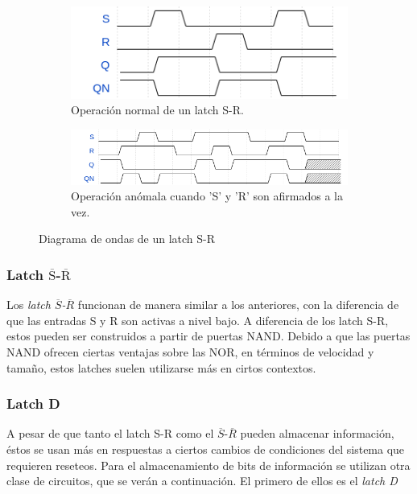 \begin{figure}[h]
    \centering
  
    \begin{subfigure}[b]{0.35\textwidth}
      \includegraphics[width=\textwidth]{figs/wavedrom-latch-sr.png}
      \caption{Operación normal de un latch S-R.}
      \label{fig:wave-latch-sr1}
    \end{subfigure}
    \hfill
    \begin{subfigure}[b]{0.55\textwidth}
      \includegraphics[width=\textwidth]{figs/wavedrom-latch-sr2.png}
      \caption{Operación anómala cuando 'S' y 'R' son afirmados a la vez.}
      \label{fig:wave-latch-sr2}
    \end{subfigure}
  
    \caption{Diagrama de ondas de un latch S-R}
    \label{fig:wave-latch-sr}
\end{figure}

\subsubsection{Latch $\overline{\text{S}}$-$\overline{\text{R}}$}
Los \emph{latch $\overline{S}$-$\overline{R}$} funcionan de manera similar a los anteriores, con la diferencia de que las entradas S y R son activas a nivel bajo. A diferencia de los latch S-R, estos pueden ser construidos a partir de puertas NAND. Debido a que las puertas NAND ofrecen ciertas ventajas sobre las NOR, en términos de velocidad y tamaño, estos latches suelen utilizarse más en cirtos contextos.

\subsubsection{Latch D}
A pesar de que tanto el latch S-R como el $\overline{S}$-$\overline{R}$ pueden almacenar información, éstos se usan más en respuestas a ciertos cambios de condiciones del sistema que requieren reseteos. Para el almacenamiento de bits de información se utilizan otra clase de circuitos, que se verán a continuación. El primero de ellos es el \emph{latch D}